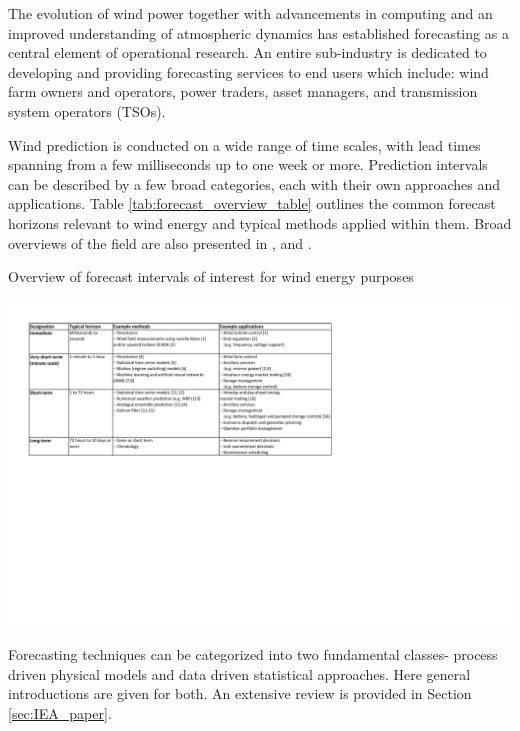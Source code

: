 The evolution of wind power together with advancements in computing and an improved understanding of atmospheric dynamics has established forecasting as a central element of operational research. An entire sub-industry is dedicated to developing and providing forecasting services to end users which include: wind farm owners and operators, power traders, asset managers, and transmission system operators (TSOs).

Wind prediction is conducted on a wide range of time scales, with lead times spanning from a few milliseconds up to one week or more. Prediction intervals can be described by a few broad categories, each with their own approaches and applications. Table \ref{tab:forecast_overview_table} outlines the common forecast horizons relevant to wind energy and typical methods applied within them. Broad overviews of the field are also presented in \cite{costa_review_2008}, \cite{giebel_state---art_2011} and \cite{soman_review_2010}.

\begin{table}
    \centering
    \caption{Overview of forecast intervals of interest for wind energy purposes}
    \includegraphics[width=1.0\textwidth]{tables/forecast_overview_table.pdf}
    
    \label{tab:forecast_overview_table}
\end{table}

Forecasting techniques can be categorized into two fundamental classes- process driven physical models and data driven statistical approaches. Here general introductions are given for both. An extensive review is provided in Section \ref{sec:IEA_paper}.

